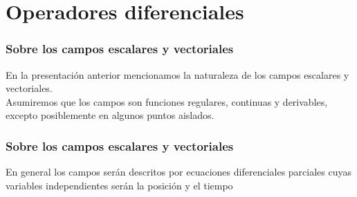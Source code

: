 \section{Operadores diferenciales}
\begin{frame}
\frametitle{Sobre los campos escalares y vectoriales}
En la presentación anterior mencionamos la naturaleza de los campos escalares y vectoriales.
\\
\bigskip
\pause
Asumiremos que los campos son funciones regulares, continuas y derivables, excepto posiblemente en algunos puntos aislados.
\end{frame}
\begin{frame}
\frametitle{Sobre los campos escalares y vectoriales}
En general los campos serán descritos por ecuaciones diferenciales parciales cuyas variables independientes serán la posición y el tiempo
\end{frame}
